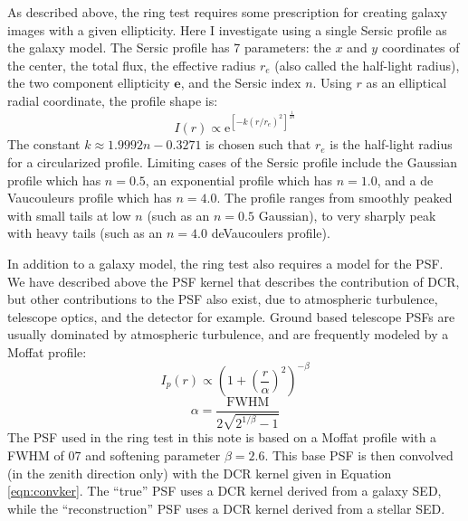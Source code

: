 \documentclass[apj]{emulateapj}
\begin{document}
As described above, the ring test requires some prescription for
creating galaxy images with a given ellipticity.  Here I investigate
using a single Sersic profile as the galaxy model.  The Sersic profile
has 7 parameters: the $x$ and $y$ coordinates of the center, the total
flux, the effective radius $r_e$ (also called the half-light radius),
the two component ellipticity $\mathbf{e}$, and the Sersic index $n$.
Using $r$ as an elliptical radial coordinate, the profile shape is:
\begin{equation}
  I(r) \propto \mathrm{e}^{[-k (r/r_e)^2]^{\frac{1}{2 n}}}
\end{equation}
The constant $k \approx 1.9992 n - 0.3271$ is chosen such that $r_e$
is the half-light radius for a circularized profile.  Limiting cases
of the Sersic profile include the Gaussian profile which has $n=0.5$,
an exponential profile which has $n=1.0$, and a de Vaucouleurs profile
which has $n=4.0$.  The profile ranges from smoothly peaked with small
tails at low $n$ (such as an $n=0.5$ Gaussian), to very sharply peak
with heavy tails (such as an $n=4.0$ deVaucoulers profile).

In addition to a galaxy model, the ring test also requires a model for
the PSF.  We have described above the PSF kernel that describes the
contribution of DCR, but other contributions to the PSF also exist,
due to atmospheric turbulence, telescope optics, and the detector for
example.  Ground based telescope PSFs are usually dominated by
atmospheric turbulence, and are frequently modeled by a Moffat
profile:
\begin{equation}
  I_p(r) \propto \left(1+\left(\frac{r}{\alpha}\right)^2\right)^{-\beta}
\end{equation}
\begin{equation}
  \alpha = \frac{\mathrm{FWHM}}{2\sqrt{2^{1/\beta}-1}}
\end{equation}
The PSF used in the ring test in this note is based on a Moffat
profile with a FWHM of $0$\farcs$7$ and softening parameter $\beta =
2.6$.  This base PSF is then convolved (in the zenith direction only)
with the DCR kernel given in Equation \ref{eqn:convker}.  The ``true''
PSF uses a DCR kernel derived from a galaxy SED, while the
``reconstruction'' PSF uses a DCR kernel derived from a stellar SED.
\end{document}
